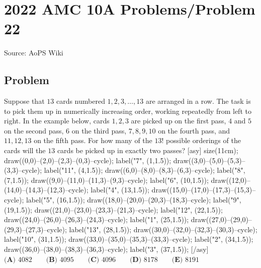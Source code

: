 \documentclass[12pt]{article}
\begin{document}
\section*{{2022 AMC 10A Problems/Problem 22}}
Source: AoPS Wiki

\subsection*{Problem}
Suppose that $13$ cards numbered $1, 2, 3, \ldots, 13$ are arranged in a row. The task is to pick them up in numerically increasing order, working repeatedly from left to right. In the example below, cards $1, 2, 3$ are picked up on the first pass, $4$ and $5$ on the second pass, $6$ on the third pass, $7, 8, 9, 10$ on the fourth pass, and $11, 12, 13$ on the fifth pass. For how many of the $13!$ possible orderings of the cards will the $13$ cards be picked up in exactly two passes? [asy] size(11cm); draw((0,0)--(2,0)--(2,3)--(0,3)--cycle); label("7", (1,1.5)); draw((3,0)--(5,0)--(5,3)--(3,3)--cycle); label("11", (4,1.5)); draw((6,0)--(8,0)--(8,3)--(6,3)--cycle); label("8", (7,1.5)); draw((9,0)--(11,0)--(11,3)--(9,3)--cycle); label("6", (10,1.5)); draw((12,0)--(14,0)--(14,3)--(12,3)--cycle); label("4", (13,1.5)); draw((15,0)--(17,0)--(17,3)--(15,3)--cycle); label("5", (16,1.5)); draw((18,0)--(20,0)--(20,3)--(18,3)--cycle); label("9", (19,1.5)); draw((21,0)--(23,0)--(23,3)--(21,3)--cycle); label("12", (22,1.5)); draw((24,0)--(26,0)--(26,3)--(24,3)--cycle); label("1", (25,1.5)); draw((27,0)--(29,0)--(29,3)--(27,3)--cycle); label("13", (28,1.5)); draw((30,0)--(32,0)--(32,3)--(30,3)--cycle); label("10", (31,1.5)); draw((33,0)--(35,0)--(35,3)--(33,3)--cycle); label("2", (34,1.5)); draw((36,0)--(38,0)--(38,3)--(36,3)--cycle); label("3", (37,1.5)); [/asy] $\textbf{(A) } 4082 \qquad \textbf{(B) } 4095 \qquad \textbf{(C) } 4096 \qquad \textbf{(D) } 8178 \qquad \textbf{(E) } 8191$
\end{document}
